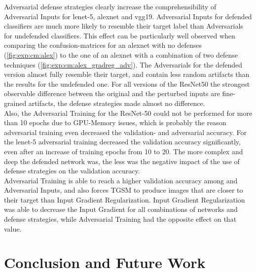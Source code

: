 \documentclass[draft,final]{vutinfth} %
\begin{document}
Adversarial defense strategies clearly increase the comprehensibility of Adversarial Inputs for lenet-5, alexnet and vgg19.
Adversarial Inputs for defended classifiers are much more likely to resemble their target label than Adversarials for undefended classifiers.
This effect can be particularly well observed when comparing the confusion-matrices for an alexnet with no defenses (\ref{fig:exp:cm:alex}) to the one of an alexnet with a combination of two defense techniques (\ref{fig:exp:cm:alex_gradreg_adv}).
The Adversarials for the defended version almost fully resemble their target, and contain less random artifacts than the results for the undefended one.
For all versions of the ResNet50 the strongest observable difference between the original and the perturbed inputs are fine-grained artifacts, the defense strategies made almost no difference.
\\
Also, the Adversarial Training for the ResNet-50 could not be performed for more than 10 epochs due to GPU-Memory issues, which is probably the reason adversarial training even decreased the validation- and adversarial accuracy.
For the lenet-5 adversarial training decreased the validation accuracy significantly, even after an increase of training epochs from 10 to 20.
The more complex and deep the defended network was, the less was the negative impact of the use of defense strategies on the validation accuracy.
\\
Adversarial Training is able to reach a higher validation accuracy among and Adversarial Inputs, and also forces TGSM to produce images that are closer to their target than Input Gradient Regularization.
Input Gradient Regularization was able to decrease the Input Gradient for all combinations of networks and defense strategies, while Adversarial Training had the opposite effect on that value.


\chapter{Conclusion and Future Work}
\end{document}
